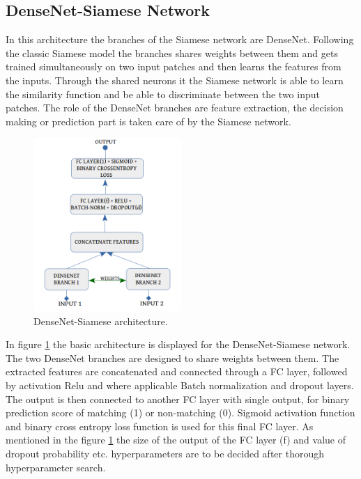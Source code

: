 \newpage
\subsection{DenseNet-Siamese Network}

In this architecture the branches of the Siamese network are DenseNet. Following the classic Siamese model the branches shares weights between them and gets trained simultaneously on two input patches and then learns the features from the inputs.
Through the shared neurons it the Siamese network is able to learn the similarity function and be able to discriminate between the two input patches. The role of the DenseNet branches are feature extraction, the decision making or prediction 
part is taken care of by the Siamese network.

\begin{figure}[ht]
\centering
\includegraphics[width=0.5\textwidth]{images/densenet/siamese_densenet_structure.png}
\caption{DenseNet-Siamese architecture.}
\label{fig:dn_siamese}
\end{figure}

In figure \ref{fig:dn_siamese} the basic architecture is displayed for the DenseNet-Siamese network. The two DenseNet branches are designed to share weights between them. The extracted features are concatenated and connected through a
FC layer, followed by activation Relu and where applicable Batch normalization and dropout layers. The output is then connected to another FC layer with single output, for binary prediction score of matching (1) or non-matching (0). 
Sigmoid activation function and binary cross entropy loss function is used for this final FC layer. As mentioned in the figure \ref{fig:dn_siamese} the size of the output of the FC layer (f) and value of dropout probability etc. hyperparameters
are to be decided after thorough hyperparameter search.

